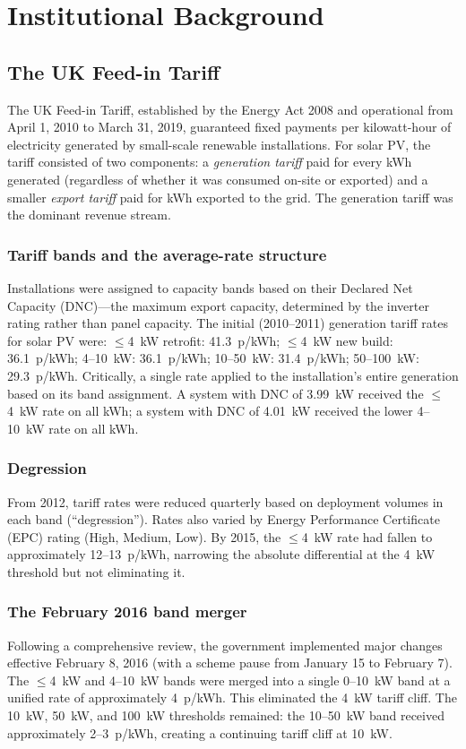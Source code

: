 \documentclass[12pt]{article}
\begin{document}
\section{Institutional Background}
\label{sec:background}

\subsection{The UK Feed-in Tariff}

The UK Feed-in Tariff, established by the Energy Act 2008 and operational from April 1, 2010 to March 31, 2019, guaranteed fixed payments per kilowatt-hour of electricity generated by small-scale renewable installations. For solar PV, the tariff consisted of two components: a \textit{generation tariff} paid for every kWh generated (regardless of whether it was consumed on-site or exported) and a smaller \textit{export tariff} paid for kWh exported to the grid. The generation tariff was the dominant revenue stream.

\subsubsection*{Tariff bands and the average-rate structure} Installations were assigned to capacity bands based on their Declared Net Capacity (DNC)---the maximum export capacity, determined by the inverter rating rather than panel capacity. The initial (2010--2011) generation tariff rates for solar PV were: $\leq$4~kW retrofit: 41.3~p/kWh; $\leq$4~kW new build: 36.1~p/kWh; 4--10~kW: 36.1~p/kWh; 10--50~kW: 31.4~p/kWh; 50--100~kW: 29.3~p/kWh. Critically, a single rate applied to the installation's entire generation based on its band assignment. A system with DNC of 3.99~kW received the $\leq$4~kW rate on all kWh; a system with DNC of 4.01~kW received the lower 4--10~kW rate on all kWh.

\subsubsection*{Degression} From 2012, tariff rates were reduced quarterly based on deployment volumes in each band (``degression''). Rates also varied by Energy Performance Certificate (EPC) rating (High, Medium, Low). By 2015, the $\leq$4~kW rate had fallen to approximately 12--13~p/kWh, narrowing the absolute differential at the 4~kW threshold but not eliminating it.

\subsubsection*{The February 2016 band merger} Following a comprehensive review, the government implemented major changes effective February 8, 2016 (with a scheme pause from January 15 to February 7). The $\leq$4~kW and 4--10~kW bands were merged into a single 0--10~kW band at a unified rate of approximately 4~p/kWh. This eliminated the 4~kW tariff cliff. The 10~kW, 50~kW, and 100~kW thresholds remained: the 10--50~kW band received approximately 2--3~p/kWh, creating a continuing tariff cliff at 10~kW.
\end{document}
